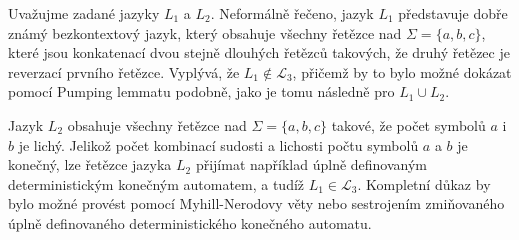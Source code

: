 \documentclass[a4paper, 12pt]{article}
\theoremstyle{definition}
\theoremstyle{definition}
\theoremstyle{definition}
\theoremstyle{remark}
\begin{document}
Uvažujme zadané jazyky $L_1$ a $L_2$. Neformálně řečeno, jazyk $L_1$ představuje dobře známý bezkontextový jazyk, který obsahuje všechny řetězce nad $\Sigma = \{a,b,c\}$, které jsou konkatenací dvou stejně dlouhých řetězců takových, že druhý řetězec je reverzací prvního řetězce. Vyplývá, že $L_1 \notin \mathcal{L}_3$, přičemž by to bylo možné dokázat pomocí Pumping lemmatu podobně, jako je tomu následně pro $L_1 \cup L_2$.

Jazyk $L_2$ obsahuje všechny řetězce nad $\Sigma = \{a, b, c\}$ takové, že počet symbolů $a$ i $b$ je lichý. Jelikož počet kombinací sudosti a lichosti počtu symbolů $a$ a $b$ je konečný, lze řetězce jazyka $L_2$ přijímat například úplně definovaným deterministickým konečným automatem, a tudíž $L_1 \in \mathcal{L}_3$. Kompletní důkaz by bylo možné provést pomocí Myhill-Nerodovy věty nebo sestrojením zmiňovaného úplně definovaného deterministického konečného automatu.
\end{document}
